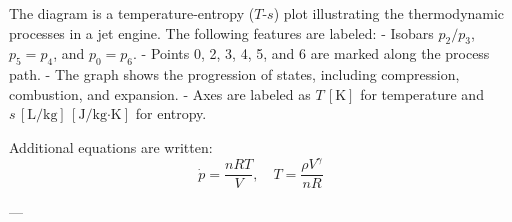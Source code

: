 The diagram is a temperature-entropy (\(T\)-\(s\)) plot illustrating the thermodynamic processes in a jet engine. The following features are labeled:  
- Isobars \(p_2/p_3\), \(p_5=p_4\), and \(p_0=p_6\).  
- Points 0, 2, 3, 4, 5, and 6 are marked along the process path.  
- The graph shows the progression of states, including compression, combustion, and expansion.  
- Axes are labeled as \(T \, [\text{K}]\) for temperature and \(s \, [\text{L}/\text{kg}] \, [\text{J}/\text{kg·K}]\) for entropy.  

Additional equations are written:  
\[
\dot{p} = \frac{nRT}{V}, \quad T = \frac{\rho V^{\gamma}}{nR}
\]

---